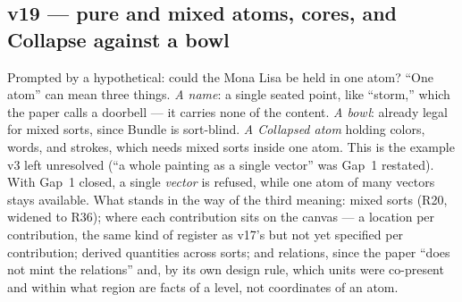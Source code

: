 \documentclass[11pt]{article}
\begin{document}
\subsection*{v19 --- pure and mixed atoms, cores, and Collapse against a bowl}
Prompted by a hypothetical: could the Mona Lisa be held in one atom?
``One atom'' can mean three things. \emph{A name}: a single seated
point, like ``storm,'' which the paper calls a doorbell --- it carries
none of the content. \emph{A bowl}: already legal for mixed sorts,
since Bundle is sort-blind. \emph{A Collapsed atom} holding colors,
words, and strokes, which needs mixed sorts inside one atom. This is
the example v3 left unresolved (``a whole painting as a single
vector'' was Gap~1 restated). With Gap~1 closed, a single
\emph{vector} is refused, while one atom of many vectors stays
available. What stands in the way of the third meaning: mixed sorts
(R20, widened to R36); where each contribution sits on the canvas ---
a location per contribution, the same kind of register as v17's but
not yet specified per contribution; derived quantities across sorts;
and relations, since the paper ``does not mint the relations'' and,
by its own design rule, which units were co-present and within what
region are facts of a level, not coordinates of an atom.
\end{document}
